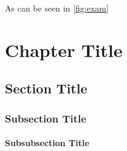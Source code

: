 As can be seen in \cref{fig:exam}\\
\chapter{Chapter Title}
\label{ch:Chapter Title}

\section{Section Title}
\label{sec:Section Title}

\subsection{Subsection Title}
\label{subsec:Subsection Title}

\subsubsection{Subsubsection Title}
\label{bb:Subsubsection Title}





